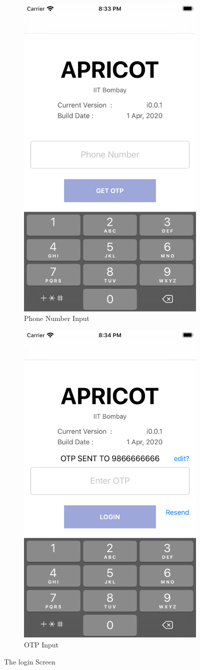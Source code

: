 \documentclass[12pt, conference, a4paper]{article}
\begin{document}
\begin{figure}[!htbp]
  \centering
  \begin{subfigure}{.5\textwidth}
    \centering
    \includegraphics[width=.5\linewidth]{login1.png}
    \caption{Phone Number Input}
    \label{fig:sub1}
  \end{subfigure}%
  \begin{subfigure}{.5\textwidth}
    \centering
    \includegraphics[width=.5\linewidth]{login2.png}
    \caption{OTP Input}
    \label{fig:sub2}
  \end{subfigure}
  \caption{The login Screen}
  \label{fig:login}
  \end{figure}
\end{document}
